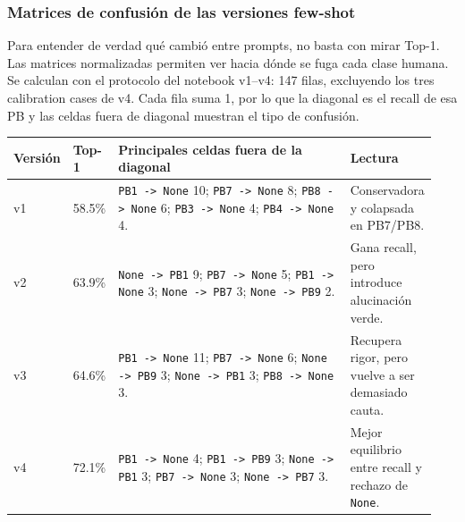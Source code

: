 \subsubsection{Matrices de confusión de las versiones few-shot}

Para entender de verdad qué cambió entre prompts, no basta con mirar Top-1. Las matrices normalizadas permiten ver hacia dónde se fuga cada clase humana. Se calculan con el protocolo del notebook v1--v4: 147 filas, excluyendo los tres calibration cases de v4. Cada fila suma 1, por lo que la diagonal es el recall de esa PB y las celdas fuera de diagonal muestran el tipo de confusión.

\begin{center}
\scriptsize
\setlength{\tabcolsep}{4pt}
\renewcommand{\arraystretch}{1.18}
\begin{tabular}{p{0.12\linewidth}p{0.10\linewidth}p{0.58\linewidth}p{0.14\linewidth}}
\toprule
Versión & Top-1 & Principales celdas fuera de la diagonal & Lectura \\
\midrule
v1 & 58.5\% & \texttt{PB1 -> None} 10; \texttt{PB7 -> None} 8; \texttt{PB8 -> None} 6; \texttt{PB3 -> None} 4; \texttt{PB4 -> None} 4. & Conservadora y colapsada en PB7/PB8. \\
v2 & 63.9\% & \texttt{None -> PB1} 9; \texttt{PB7 -> None} 5; \texttt{PB1 -> None} 3; \texttt{None -> PB7} 3; \texttt{None -> PB9} 2. & Gana recall, pero introduce alucinación verde. \\
v3 & 64.6\% & \texttt{PB1 -> None} 11; \texttt{PB7 -> None} 6; \texttt{None -> PB9} 3; \texttt{None -> PB1} 3; \texttt{PB8 -> None} 3. & Recupera rigor, pero vuelve a ser demasiado cauta. \\
v4 & 72.1\% & \texttt{PB1 -> None} 4; \texttt{PB1 -> PB9} 3; \texttt{None -> PB1} 3; \texttt{PB7 -> None} 3; \texttt{None -> PB7} 3. & Mejor equilibrio entre recall y rechazo de \texttt{None}. \\
\bottomrule
\end{tabular}
\end{center}


